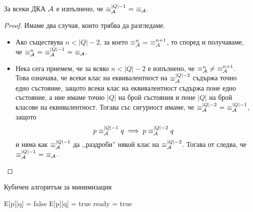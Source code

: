 \begin{proposition}
  За всеки ДКА $\mathcal{A}$ е изпълнено, че 
  $\equiv^{|Q|-1}_\A\ =\ \equiv_\A$.
\end{proposition}
\begin{proof}
  Имаме два случая, които трябва да разгледаме.
  \begin{itemize}
  \item
    Ако съществува $n < |Q| - 2$, за което $\equiv^n_\A\ =\ \equiv^{n+1}_\A$, то според  и 
    получаваме, че $\equiv^n_\A\ =\ \equiv^{|Q|-1}_\A\ =\ \equiv_\A$.
  \item
    Нека сега приемем, че за всяко $n < |Q|-2$ е изпълнено, че $\equiv^n_\A\ \neq\ \equiv^{n+1}_\A$.
    Това означава, че всеки клас на еквивалентност на $\equiv^{|Q|-2}_{\mathcal{A}}$ съдържа точно едно състояние, защото
    всеки клас на еквивалентност съдържа поне едно състояние, а ние имаме точно $|Q|$ на брой състояния и поне $|Q|$ на брой класове на еквивалентност.
    Тогава със сигурност имаме, че $\equiv^{|Q|-2}_{\mathcal{A}}\ =\ \equiv^{|Q|-1}_{\mathcal{A}}$,
    защото
    \[p \equiv^{|Q|-1}_{\mathcal{A}} q \implies p \equiv^{|Q|-2}_{\mathcal{A}} q\]
    и няма как $\equiv^{|Q|-1}_{\mathcal{A}}$ да ,,раздроби'' някой клас на $\equiv^{|Q|-2}_{\mathcal{A}}$.
    Тогава от  следва, че $\equiv^{|Q|-1}_\A\ =\ \equiv_\A$.
  \end{itemize}
\end{proof}


\begin{algorithm}[H]
  \caption{Кубичен алгоритъм за минимизация}
  \label{alg:minimisation-cube}
  \begin{algorithmic}[1]
    \State E[p][q] = false 
    \Else
    \State E[p][q] = true 
    \EndIf
    \EndFor
    \EndFor
    \Repeat
    \State ready = true
     
      
     
     
    \EndIf
    \EndFor
    \EndIf
    \EndFor
    \EndFor
     
  \end{algorithmic}
\end{algorithm}

